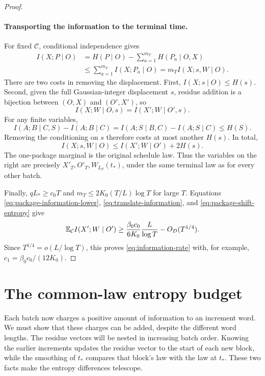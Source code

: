 \begin{proof}
\paragraph{Transporting the information to the terminal time.}
For fixed \(\mathcal C\), conditional independence gives
\[
 \begin{aligned}
 I(X;P\mid O)
 &=H(P\mid O)-\sum_{a=1}^{m_T}H(P_a\mid O,X)\\
 &\le\sum_{a=1}^{m_T}I(X;P_a\mid O)
 =m_TI(X;s,W\mid O).
 \end{aligned}
\]
There are two costs in removing the displacement. First,
\(I(X;s\mid O)\le H(s)\). Second, given the full Gaussian-integer
displacement \(s\), residue addition is a bijection between
\((O,X)\) and \((O',X')\), so
\[
 I(X;W\mid O,s)=I(X';W\mid O',s).
\]
For any finite variables,
\[
 I(A;B\mid C,S)-I(A;B\mid C)
 =I(A;S\mid B,C)-I(A;S\mid C)\le H(S).
\]
Removing the conditioning on \(s\) therefore costs at most another
\(H(s)\). In total,
\begin{equation}
 I(X;s,W\mid O)\le I(X';W\mid O')+2H(s).
 \label{eq:translate-information}
\end{equation}
The one-package marginal is the original schedule law. Thus the
variables on the right are precisely
\(X'_T,O'_T,W_{L_T}(t_*)\), under the same terminal law as for
every other batch.

Finally, \(qL_*\ge c_0T\) and
\(m_T\le2K_0(T/L)\log T\) for large \(T\). Equations
\eqref{eq:package-information-lower},
\eqref{eq:translate-information}, and
\eqref{eq:package-shift-entropy} give
\[
 \mathbb E_{\mathcal C}I(X';W\mid O')
 \ge\frac{\beta_0c_0}{6K_0}\frac{L}{\log T}-O_D(T^{1/4}).
\]
Since \(T^{1/4}=o(L/\log T)\), this proves
\eqref{eq:information-rate} with, for example,
\(c_1=\beta_0c_0/(12K_0)\).
\end{proof}

\section{The common-law entropy budget}
\label{sec:budget}

Each batch now charges a positive amount of information to an increment
word. We must show that these charges can be added, despite the different
word lengths. The residue vectors will be nested in increasing batch
order. Knowing the earlier increments updates the residue vector to the
start of each new block, while the smoothing of \(t_*\) compares that
block's law with the law at \(t_*\). These two facts make the entropy
differences telescope.

